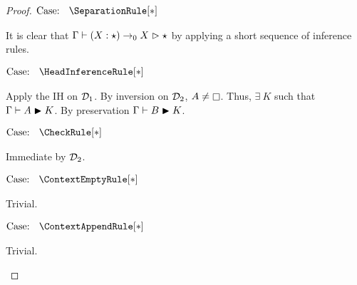 \begin{proof}
    $\text{Case: }\begin{array}{c} \SeparationRule[*] \end{array}$
    \begin{proofcase}
        It is clear that $\Gamma \vdash (X : \star) \to_0 X \vartriangleright \star$ by applying a short sequence of inference rules.
    \end{proofcase}

    $\text{Case: }\begin{array}{c} \HeadInferenceRule[*] \end{array}$
    \begin{proofcase}
        Apply the IH on $\mathcal{D}_{1}$.
        By inversion on $\mathcal{D}_{2}$, $A \neq \kind$.
        Thus, $\exists\ K$ such that $\Gamma \vdash A \blacktriangleright K$.
        By preservation $\Gamma \vdash B \blacktriangleright K$.
    \end{proofcase}

    $\text{Case: }\begin{array}{c} \CheckRule[*] \end{array}$
    \begin{proofcase}
        Immediate by $\mathcal{D}_{2}$.
    \end{proofcase}

    $\text{Case: }\begin{array}{c} \ContextEmptyRule[*] \end{array}$
    \begin{proofcase}
        Trivial.
    \end{proofcase}

    $\text{Case: }\begin{array}{c} \ContextAppendRule[*] \end{array}$
    \begin{proofcase}
        Trivial.
    \end{proofcase}
\end{proof}
